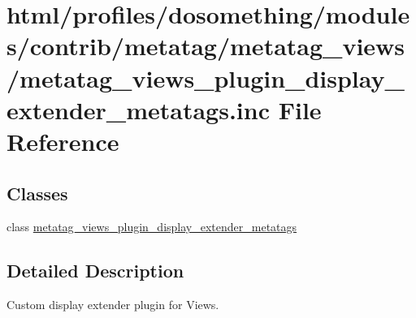 \hypertarget{metatag__views__plugin__display__extender__metatags_8inc}{
\section{html/profiles/dosomething/modules/contrib/metatag/metatag\_\-views/metatag\_\-views\_\-plugin\_\-display\_\-extender\_\-metatags.inc File Reference}
\label{metatag__views__plugin__display__extender__metatags_8inc}
}
\subsection*{Classes}
\begin{DoxyCompactItemize}
\item 
class \hyperlink{classmetatag__views__plugin__display__extender__metatags}{metatag\_\-views\_\-plugin\_\-display\_\-extender\_\-metatags}
\end{DoxyCompactItemize}


\subsection{Detailed Description}
Custom display extender plugin for Views. 